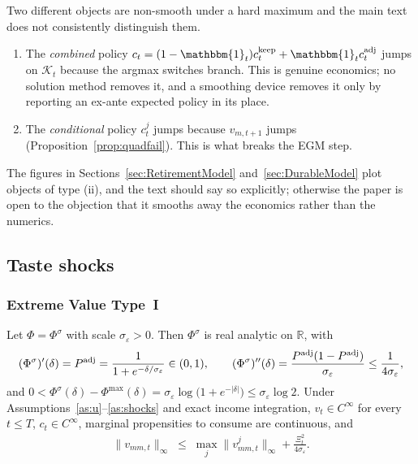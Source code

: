 \begin{remark}
\label{rem:twodiscont}
Two different objects are non-smooth under a hard maximum and the main text does not
consistently distinguish them.
\begin{enumerate}
    \item The \emph{combined} policy $c_t=(1-\mathbbm{1}_t)c_t^{\keep}+\mathbbm{1}_t c_t^{\adj}$
    jumps on $\mathcal{K}_t$ because the argmax switches branch. This is genuine
    economics; no solution method removes it, and a smoothing device removes it only by
    reporting an ex-ante expected policy in its place.
    \item The \emph{conditional} policy $c_t^{j}$ jumps because $v_{m,t+1}$ jumps
    (Proposition~\ref{prop:quadfail}). This is what breaks the EGM step.
\end{enumerate}
The figures in Sections~\ref{sec:RetirementModel} and~\ref{sec:DurableModel} plot
objects of type (ii), and the text should say so explicitly; otherwise the paper is
open to the objection that it smooths away the economics rather than the numerics.
\end{remark}

\subsection{Taste shocks}
\label{subsec:smooth_taste}

\subsubsection{Extreme Value Type~I}

\begin{proposition}
\label{prop:evtaste}
Let $\Phi=\Phi^{\sigma}$ with scale $\sigma_\varepsilon>0$. Then $\Phi^{\sigma}$ is real
analytic on $\mathbb{R}$, with
\begin{align}
(\Phi^{\sigma})'(\delta) = P^{\mathrm{adj}}=\frac{1}{1+e^{-\delta/\sigma_\varepsilon}}\in(0,1),
\qquad
(\Phi^{\sigma})''(\delta) = \frac{P^{\mathrm{adj}}(1-P^{\mathrm{adj}})}{\sigma_\varepsilon}\le\frac{1}{4\sigma_\varepsilon},
\end{align}
and $0<\Phi^{\sigma}(\delta)-\Phi^{\max}(\delta)=\sigma_\varepsilon\log\big(1+e^{-|\delta|}\big)\le\sigma_\varepsilon\log 2$.
Under Assumptions~\ref{as:u}--\ref{as:shocks} and exact income integration,
$v_t\in C^{\infty}$ for every $t\le T$, $c_t\in C^{\infty}$, marginal propensities to
consume are continuous, and
\begin{align}
\big\|v_{mm,t}\big\|_{\infty} \;\le\; \max_{j}\big\|v_{mm,t}^{j}\big\|_{\infty}
+ \frac{\Xi_t^{2}}{4\sigma_\varepsilon}.
\label{eq:ev_curvature}
\end{align}
\end{proposition}


